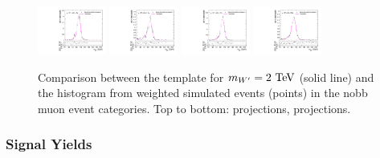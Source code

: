\begin{figure}[htpb]
  \includegraphics[width=0.2\textwidth]{fig/2Dfit/templateVsReco_VBFWprToWZ2000_r0_MJ_mu_HP_nobb_LDy.pdf}
  \includegraphics[width=0.2\textwidth]{fig/2Dfit/templateVsReco_VBFWprToWZ2000_r0_MJ_mu_LP_nobb_LDy.pdf}
  \includegraphics[width=0.2\textwidth]{fig/2Dfit/templateVsReco_VBFWprToWZ2000_r0_MJ_mu_HP_nobb_HDy.pdf}
  \includegraphics[width=0.2\textwidth]{fig/2Dfit/templateVsReco_VBFWprToWZ2000_r0_MJ_mu_LP_nobb_HDy.pdf}\\
  \caption{
    Comparison between the \VBF\WprtoWZ template for $m_{\Wpr}=2\unit{TeV}$ (solid line) and the histogram from weighted simulated events (points) in the nobb muon event categories.
    Top to bottom: \MVV projections, \MJ projections.
  }
  \label{fig:1dtemplateVsReco_VBFWprToWZ2000_Run2}
\end{figure}

\subsubsection{Signal Yields}

